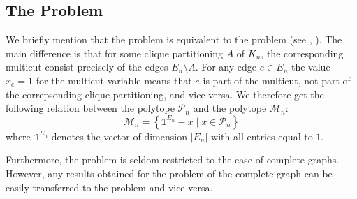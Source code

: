\subsection{The \MC Problem}
We briefly mention that the \CP problem is equivalent to the \MC problem (see \eg \cite{chopraPartitionProblem1993}, \cite{dezaCliqueWebFacetsMulticut1992}).
The main difference is that for some clique partitioning $A$ of $K_{n}$, the corresponding multicut consist precisely of the edges $E_{n} \setminus A$.
For any edge $e \in E_{n}$ the value $x_{e} = 1$ for the multicut variable means that $e$ is part of the multicut, \ie not part of the correpsonding clique partitioning, and vice versa.
We therefore get the following relation between the \CP polytope $\mathscr{P}_{n}$ and the \MC polytope $\mathscr{M}_{n}$:
\[
	\mathscr{M}_{n} = \left\{ \mathbb{1}^{E_{n}} - x \mid x \in \mathscr{P}_{n} \right\}
\]
where $\mathbb{1}^{E_{n}}$ denotes the vector of dimension $\lvert E_{n} \rvert$ with all entries equal to $1$.

Furthermore, the \MC problem is seldom restricted to the case of complete graphs.
However, any results obtained for the \MC problem of the complete graph can be easily transferred to the \CP problem and vice versa.
